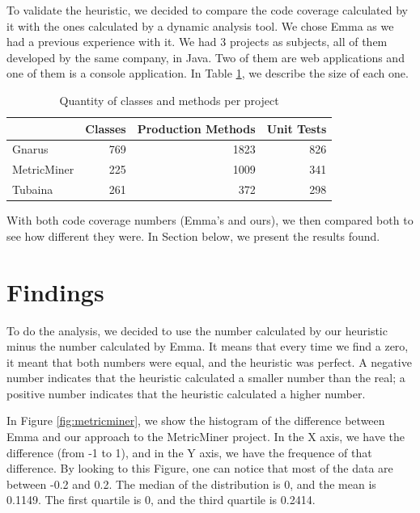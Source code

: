 \documentclass{sig-alternate}
\begin{document}
To validate the heuristic, we decided to compare the code coverage calculated by it with the ones 
calculated by a dynamic analysis tool. We chose Emma as we had a previous experience with it. We
had 3 projects as subjects, all of them developed by the same company, in Java. Two of them are
web applications and one of them is a console application. In Table \ref{tab:projects}, we describe
the size of each one.

\begin{table}[h!]
\centering
\caption{Quantity of classes and methods per project}
\begin{tabular}{ | l | r | r | r | }
\hline
& Classes & Production Methods & Unit Tests\\ 
\hline
Gnarus & 769 & 1823 & 826\\ 
MetricMiner & 225 & 1009 & 341\\ 
Tubaina & 261 & 372 & 298\\ 

\hline
\end{tabular}
\label{tab:projects}
\end{table}

With both code coverage numbers (Emma's and ours), we then compared both to see how different
they were. In Section below, we present the results found.

\section{Findings}

To do the analysis, we decided to use the number calculated by our heuristic minus the
number calculated by Emma. It means that every time we find a zero, it meant that both numbers
were equal, and the heuristic was perfect. A negative number indicates that the heuristic calculated
a smaller number than the real; a positive number indicates that the heuristic calculated a higher
number.

In Figure \ref{fig:metricminer}, we show the histogram of the difference between Emma and our approach to
the MetricMiner project.
In the X axis, we have the difference (from -1 to 1), and in the Y axis, we have the frequence of that difference.
By looking to this Figure, one can notice that most of the data are between -0.2 and 0.2. 
The median of the distribution is 0, and the mean is 0.1149. The first quartile is 0, and the
third quartile is 0.2414.
\end{document}
